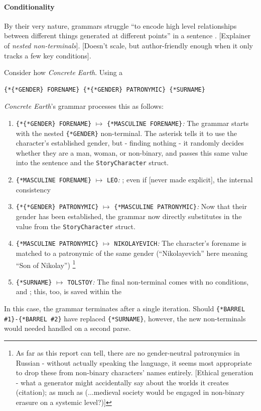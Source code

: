 \documentclass[a4paper, 11pt]{article}
\begin{document}
\begin{flushleft}
\paragraph{Conditionality} By their very nature, grammars struggle ``to encode high level relationships between different things generated at different points'' in a sentence \citep{cmptn19}. [Explainer of \textit{nested non-terminals}]. [Doesn't scale, but author-friendly enough when it only tracks a few key conditions].

\vspace{5pt}\noindent
Consider how \textit{Concrete Earth}. Using a 
\begin{center}
\begin{BVerbatim}
{*{*GENDER} FORENAME} {*{*GENDER} PATRONYMIC} {*SURNAME}
\end{BVerbatim}
\end{center}
\textit{Concrete Earth}'s grammar processes this as follows:
\begin{enumerate}[label=\textit{\arabic*}\textit{.}, noitemsep]
\item \verb|{*{*GENDER} FORENAME}| $\mapsto$ \verb|{*MASCULINE FORENAME}|\textit{:} The grammar starts with the nested \verb|{*GENDER}| non-terminal. The asterisk tells it to use the character's established gender, but - finding nothing - it randomly decides whether they are a man, woman, or non-binary, and passes this same value into the sentence and the \texttt{StoryCharacter} struct.
\item \verb|{*MASCULINE FORENAME}| $\mapsto$ \verb|LEO|\textit{:} ; even if [never made explicit], the internal consistency
\item \verb|{*{*GENDER} PATRONYMIC}| $\mapsto$ \verb|{*MASCULINE PATRONYMIC}|\textit{:} Now that their gender has been established, the grammar now directly substitutes in the value from the \texttt{StoryCharacter} struct.
\item \verb|{*MASCULINE PATRONYMIC}| $\mapsto$ \verb|NIKOLAYEVICH|\textit{:} The character's forename is matched to a patronymic of the same gender (``Nikolayevich'' here meaning ``Son of Nikolay'') \footnote{As far as this report can tell, there are no gender-neutral patronymics in Russian - without actually speaking the language, it seems most appropriate to drop these from non-binary characters' names entirely. [Ethical generation - what a generator might accidentally say about the worlds it creates (citation); as much as (...medieval society would be engaged in non-binary erasure on a systemic level?)]}
\item \verb|{*SURNAME}| $\mapsto$ \verb|TOLSTOY|\textit{:} The final non-terminal comes with no conditions, and ; this, too, is saved within the
\end{enumerate}
In this case, the grammar terminates after a single iteration. Should \verb|{*BARREL #1}-{*BARREL #2}| have replaced \verb|{*SURNAME}|, however, the new non-terminals would needed handled on a second parse.


\end{flushleft}
\end{document}
